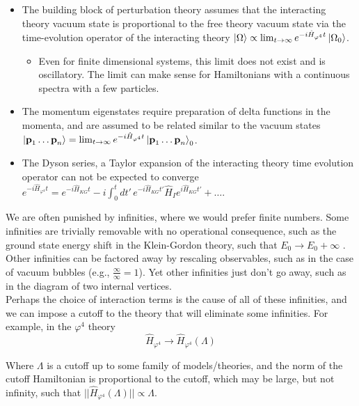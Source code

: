 \begin{itemize}
\item The building block of perturbation theory assumes that the interacting theory vacuum state is proportional to the free theory vacuum state via the time-evolution operator of the interacting theory
	\subitem $\ket{\Omega} \propto \lim_{t\to\infty} e^{-i\hat{H}_{\varphi^4}t} \ket{\Omega_0}$.
	\begin{itemize} 
	\item Even for finite dimensional systems, this limit does not exist and is oscillatory. The limit can make sense for Hamiltonians with a continuous spectra with a few particles.
	\end{itemize}
\item The momentum eigenstates require preparation of delta functions in the momenta, and are assumed to be related similar to the vacuum states
	\subitem $\ket{\textbf{p}_1 \dots \textbf{p}_n} = \lim_{t\to\infty} e^{-i\hat{H}_{\varphi^4}t} \ket{\textbf{p}_1 \dots \textbf{p}_n}_0$.
\item The Dyson series, a Taylor expansion of the interacting theory time evolution operator can not be expected to converge
	\subitem $e^{-i\hat{H}_{\varphi^4}t} = e^{-i\hat{H}_{KG}t} -i \int_0^t dt' \, e^{-i\hat{H}_{KG}t'} \hat{H}_I e^{i\hat{H}_{KG}t'} + \dots$.
\end{itemize}

\noindent We are often punished by infinities, where we would prefer finite numbers. Some infinities are trivially removable with no operational consequence, such as the ground state energy shift in the Klein-Gordon theory, such that $E_0 \to E_0 + \infty$ . Other infinities can be factored away by rescaling observables, such as in the case of vacuum bubbles (e.g., $\frac{\infty}{\infty} = 1$). Yet other infinities just don't go away, such as in the diagram of two internal vertices. \\

\noindent Perhaps the choice of interaction terms is the cause of all of these infinities, and we can impose a cutoff to the theory that will eliminate some infinities. For example, in the $\varphi^4$ theory
\begin{equation}
\hat{H}_{\varphi^4} \to \hat{H}_{\varphi^4}(\Lambda)
\end{equation}

\noindent Where $\Lambda$ is a cutoff up to some family of models/theories, and the norm of the cutoff Hamiltonian is proportional to the cutoff, which may be large, but not infinity, such that $||\hat{H}_{\varphi^4}(\Lambda) || \propto \Lambda$. \\

